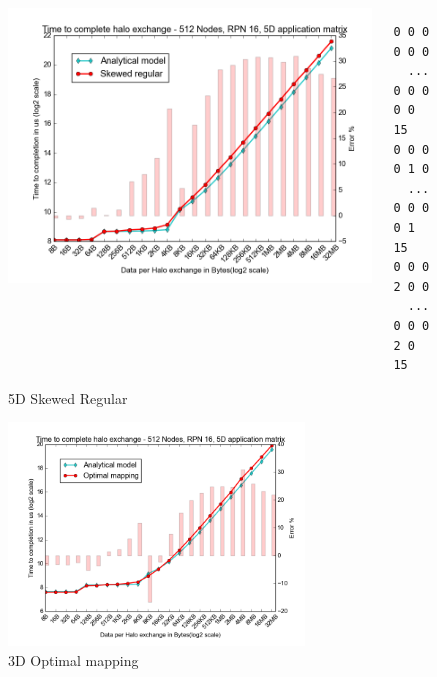 \documentclass{beamer}
\begin{document}
\begin{frame}
\begin{figure}
\caption{5D Skewed Regular}
\begin{columns}
  \begin{column}{0.6\textwidth}
    \includegraphics[width=1\textwidth]{../mappings/5d_skewed_regular.png}
  \end{column}
  \begin{column}{0.3\textwidth}
\lstset{title=Mapping sample}
\begin{lstlisting}[basicstyle=\footnotesize\ttfamily, frame=lines,columns=fixed]
0 0 0 0 0 0
  ...
0 0 0 0 0 15
0 0 0 0 1 0
  ...
0 0 0 0 1 15
0 0 0 2 0 0
  ...
0 0 0 2 0 15
\end{lstlisting}
  \end{column}
\end{columns}
\end{figure}
\end{frame}

\fi
\begin{frame}
\begin{figure}
\caption{3D Optimal mapping}
  \includegraphics[width=0.7\textwidth]{../mappings/3d_optimal.png}
\end{figure}
\end{frame}
\end{document}
